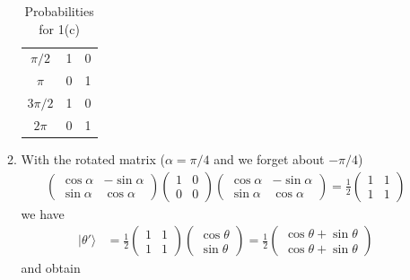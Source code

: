 \documentclass{article}
\begin{document}
\begin{enumerate}
\begin{enumerate}
\begin{table}[!h]
\begin{tabular}{c|c|c}
             $\pi/2$   & 1 & 0\\
             $\pi$     & 0 & 1\\
             $3\pi/2$  & 1 & 0\\
             $2\pi$    & 0 & 1\\
            \end{tabular}
            \caption{Probabilities for 1(c)}
            \label{tab:my_label}
        \end{table}
        \item With the rotated matrix ($\alpha=\pi/4$ and we forget about $-\pi/4$)
        \begin{align}
            \begin{pmatrix}
            \cos\alpha & -\sin\alpha\\
            \sin\alpha & \cos\alpha
            \end{pmatrix}
            \begin{pmatrix}
            1 & 0\\
            0 & 0
            \end{pmatrix}
            \begin{pmatrix}
            \cos\alpha & -\sin\alpha\\
            \sin\alpha & \cos\alpha
            \end{pmatrix}=\frac{1}{2}\begin{pmatrix}
            1 & 1\\
            1 & 1
            \end{pmatrix}
        \end{align}
        we have
        \begin{align}
            |\theta'\rangle&=\frac{1}{2}\begin{pmatrix}
            1 & 1\\
            1 & 1
            \end{pmatrix}
            \begin{pmatrix}
            \cos\theta\\
            \sin\theta
            \end{pmatrix}=
            \frac{1}{2}\begin{pmatrix}
            \cos\theta+\sin\theta\\
            \cos\theta+\sin\theta
            \end{pmatrix}
        \end{align}
        and obtain
        \begin{align}

\end{align}
\end{enumerate}
\end{enumerate}
\end{document}
